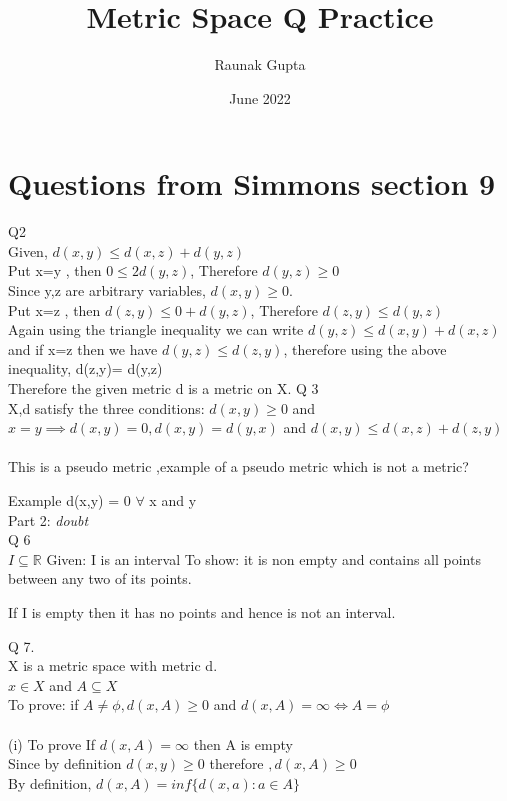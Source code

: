 \documentclass{article}
\title{Metric Space Q Practice}
\author{Raunak Gupta}
\date{June 2022}
\begin{document}
\maketitle

\section{Questions from Simmons section 9}

\proof Q2\\

Given, $d(x,y) \leq d(x,z) + d(y,z)$ \\
Put x=y , then $0 \leq 2d(y,z)$, Therefore $d(y,z) \geq 0$\\
Since y,z are arbitrary variables, $d(x,y) \geq 0$.\\
Put x=z , then $d(z,y) \leq 0 + d(y,z)$, Therefore $d(z,y) \leq  d(y,z)$\\
Again using the triangle inequality we can write $d(y,z) \leq d(x,y)+ d(x,z)$ and if x=z then we 
have $d(y,z) \leq  d(z,y)$, therefore using the above inequality, d(z,y)= d(y,z)\\
Therefore the given metric d is a metric on X.
\proof Q 3\\
X,d satisfy the three conditions:
$d(x,y) \geq 0$ and $x=y \implies d(x,y)=0,
d(x,y) = d(y,x)$ and $d(x,y) \leq d(x,z) + d(z,y)$\\\\
This is a pseudo metric ,example of a pseudo metric which is not a metric?

Example d(x,y) = 0 $\forall$ x and y\\
Part 2: \emph{doubt}\\
\proof Q 6\\
$I \subseteq \mathbb{R}$
Given: I is an interval
To show: it is non empty and contains all points between any two of its points.

If I is empty then it has no points and hence is not an interval.




\proof  Q 7. \\
X is a metric space with metric d.\\
$x \in X$ and
$A \subseteq X$\\
To prove: if $A \neq \phi ,d(x,A)\geq 0$ and 
$d(x,A)= \infty  \Longleftrightarrow A = \phi$\\\\
(i) To prove If  $d(x,A)=\infty$ then A is empty\\
Since by definition $d(x,y) \geq 0$ therefore $,d(x,A)\geq 0$\\
By definition, $d(x,A) = inf \{d(x,a) : a \in A\}$ 
\end{document}
